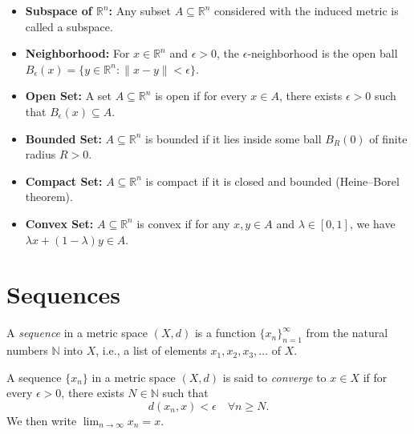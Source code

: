\begin{itemize}
    \item \textbf{Subspace of $\mathbb{R}^n$:} Any subset $A \subseteq \mathbb{R}^n$ considered with the induced metric is called a subspace.

    \item \textbf{Neighborhood:} For $x \in \mathbb{R}^n$ and $\epsilon > 0$, the $\epsilon$-neighborhood is the open ball $B_\epsilon(x) = \{y \in \mathbb{R}^n : \|x-y\| < \epsilon\}$.

    \item \textbf{Open Set:} A set $A \subseteq \mathbb{R}^n$ is open if for every $x \in A$, there exists $\epsilon > 0$ such that $B_\epsilon(x) \subseteq A$.

    \item \textbf{Bounded Set:} $A \subseteq \mathbb{R}^n$ is bounded if it lies inside some ball $B_R(0)$ of finite radius $R > 0$.

    \item \textbf{Compact Set:} $A \subseteq \mathbb{R}^n$ is compact if it is closed and bounded (Heine–Borel theorem).

    \item \textbf{Convex Set:} $A \subseteq \mathbb{R}^n$ is convex if for any $x,y \in A$ and $\lambda \in [0,1]$, we have $\lambda x + (1-\lambda)y \in A$.
\end{itemize}

\section{Sequences}

\begin{definition}
A \emph{sequence} in a metric space $(X,d)$ is a function $\{x_n\}_{n=1}^\infty$ from the natural numbers $\mathbb{N}$ into $X$, i.e., a list of elements $x_1, x_2, x_3, \dots$ of $X$.
\end{definition}

\begin{definition}
A sequence $\{x_n\}$ in a metric space $(X,d)$ is said to \emph{converge} to $x \in X$ if for every $\epsilon > 0$, there exists $N \in \mathbb{N}$ such that
\begin{equation}
d(x_n, x) < \epsilon \quad \forall n \geq N.
\end{equation}
We then write $\lim_{n \to \infty} x_n = x$.
\end{definition}

